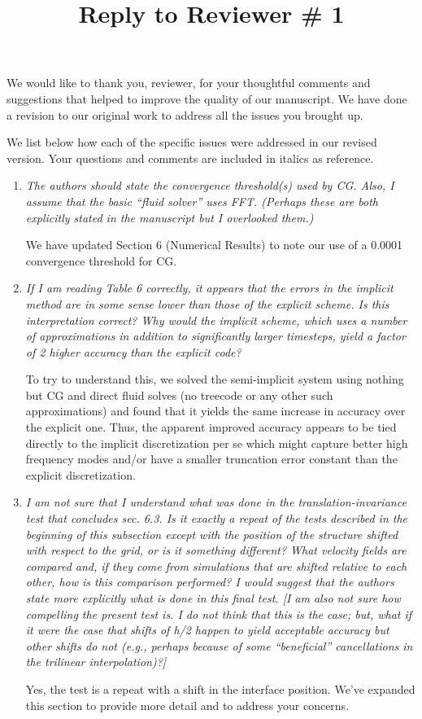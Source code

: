\documentclass[12pt]{article}
\title{Reply to Reviewer \# 1}
\author{}
\begin{document}
\maketitle
We would like to thank you,  reviewer,  for your thoughtful  comments and suggestions that helped to improve  the quality of our manuscript. 
We have done a revision to our original work to address all the issues you brought up.


We list below how each of the specific issues were addressed in our revised version. Your questions and comments are included in italics as reference.



\begin{enumerate}
\item {\em The authors should state the convergence threshold(s) used by CG.  Also, I assume that the basic ``fluid solver'' uses FFT.  (Perhaps these are both explicitly stated in the manuscript but I overlooked them.)}

We have updated Section 6 (Numerical Results) to note our use of a 0.0001
convergence threshold for CG.


\item {\em If I am reading Table 6 correctly, it appears that the errors in the implicit method are in some sense lower than those of the explicit scheme.  Is this interpretation correct?  Why would the implicit scheme, which uses a number of approximations in addition to significantly larger timesteps, yield a factor of 2 higher accuracy than the explicit code?}

To try to understand this, we solved the semi-implicit system using
nothing but CG and direct fluid solves (no treecode or any other such
approximations) and found that it yields the same increase in accuracy over the
explicit one. Thus, the apparent improved accuracy appears to be tied directly to the implicit discretization per se which might capture better high frequency modes and/or have a smaller truncation error constant than the explicit discretization.


\item {\em I am not sure that I understand what was done in the
translation-invariance test that concludes sec. 6.3.  Is it exactly a repeat of the tests described in the beginning of this subsection except with the position of the structure shifted with respect to the grid, or is it something different?  What velocity fields are compared and, if they come from simulations that are shifted relative to each other, how is this comparison performed?  I would suggest that the authors state more explicitly what is done in this final test.  [I am also not sure how compelling the present test is.  I do not think that this is the case; but, what if it were the case that shifts of h/2 happen to yield acceptable accuracy but other shifts do not (e.g., perhaps because of some ``beneficial'' cancellations in the trilinear interpolation)?]}

Yes, the test is a repeat with a shift in the interface position. We've expanded this section to provide more detail and to address your concerns. 

\end{enumerate}
\end{document}
